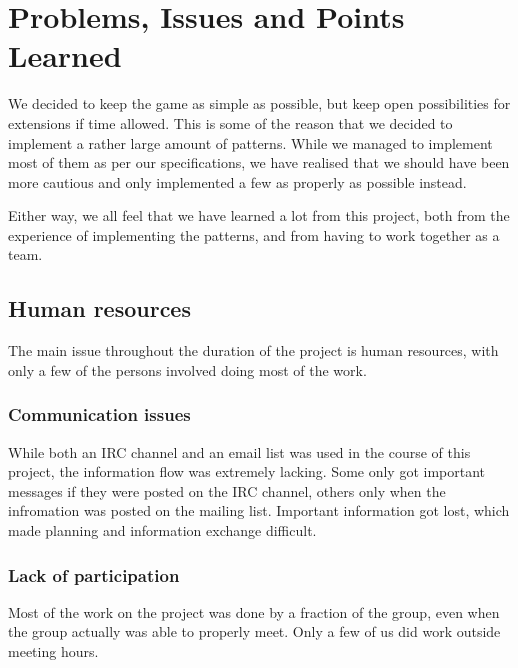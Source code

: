 \chapter{Problems, Issues and Points Learned}
\label{cha:problems_issues_and_points_learned}



We decided to keep the game as simple as possible, but keep open possibilities for extensions if time allowed. This is some of the reason that we decided to implement a rather large amount of patterns. While we managed to implement most of them as per our specifications, we have realised that we should have been more cautious and only implemented a few as properly as possible instead.

Either way, we all feel that we have learned a lot from this project, both from the experience of implementing the patterns, and from having to work together as a team.


\section{Human resources}
The main issue throughout the duration of the project is human resources, with only a few of the persons involved doing most of the work. 


\subsection{Communication issues}
While both an IRC channel and an email list was used in the course of this project, the information flow was extremely lacking. Some only got important messages if they were posted on the IRC channel, others only when the infromation was posted on the mailing list. Important information got lost, which made planning and information exchange difficult.


\subsection{Lack of participation}
Most of the work on the project was done by a fraction of the group, even when the group actually was able to properly meet. Only a few of us did work outside meeting hours.


